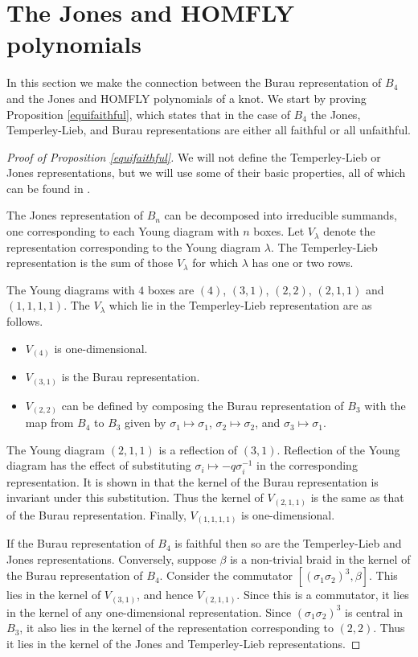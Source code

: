 \documentclass[10pt]{amsart}
\theoremstyle{plain}
\theoremstyle{definition}
\begin{document}
\section{The Jones and HOMFLY polynomials}
\label{jones}

In this section we make the connection between
the Burau representation of $B_4$
and the Jones and HOMFLY polynomials of a knot.
We start by proving Proposition \ref{equifaithful},
which states that in the case of $B_4$
the Jones, Temperley-Lieb, and Burau representations
are either all faithful or all unfaithful.

\begin{proof}[Proof of Proposition \ref{equifaithful}]
We will not define the Temperley-Lieb or Jones representations,
but we will use some of their basic properties,
all of which can be found in \cite{jones}.

The Jones representation of $B_n$
can be decomposed into irreducible summands,
one corresponding to each Young diagram with $n$ boxes.
Let $V_\lambda$ denote the representation
corresponding to the Young diagram $\lambda$.
The Temperley-Lieb representation
is the sum of those $V_\lambda$ for which $\lambda$ has one or two rows.

The Young diagrams with $4$ boxes are
$(4)$, $(3,1)$, $(2,2)$, $(2,1,1)$ and $(1,1,1,1)$.
The $V_\lambda$ which lie in the Temperley-Lieb representation
are as follows.
\begin{itemize}
\item $V_{(4)}$ is one-dimensional.
\item $V_{(3,1)}$ is the Burau representation.
\item $V_{(2,2)}$
   can be defined by composing the Burau representation of $B_3$
   with the map from $B_4$ to $B_3$ given by
   $\sigma_1 \mapsto \sigma_1$,
   $\sigma_2 \mapsto \sigma_2$, and
   $\sigma_3 \mapsto \sigma_1$.
\end{itemize}

The Young diagram $(2,1,1)$
is a reflection of $(3,1)$.
Reflection of the Young diagram has the effect of substituting
$\sigma_i \mapsto -q\sigma_i^{-1}$ in the corresponding representation.
It is shown in \cite{long-paton}
that the kernel of the Burau representation
is invariant under this substitution.
Thus the kernel of $V_{(2,1,1)}$
is the same as that of the Burau representation.
Finally, $V_{(1,1,1,1)}$ is one-dimensional.

If the Burau representation of $B_4$ is faithful
then so are the Temperley-Lieb and Jones representations.
Conversely, suppose $\beta$ is a non-trivial braid
in the kernel of the Burau representation of $B_4$.
Consider the commutator $[(\sigma_1 \sigma_2)^3,\beta]$.
This lies in the kernel of $V_{(3,1)}$, and hence $V_{(2,1,1)}$.
Since this is a commutator,
it lies in the kernel of any one-dimensional representation.
Since $(\sigma_1 \sigma_2)^3$ is central in $B_3$,
it also lies in the kernel of the representation corresponding to $(2,2)$.
Thus it lies in the kernel
of the Jones and Temperley-Lieb representations.


\end{proof}
\end{document}
